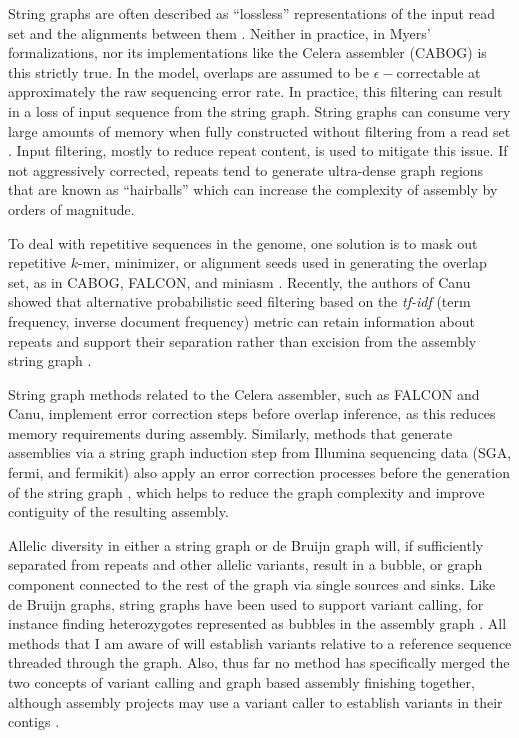 String graphs are often described as ``lossless'' representations of the input read set and the alignments between them \cite{li2012exploring}.
Neither in practice, in Myers' formalizations, nor its implementations like the Celera assembler (CABOG) \cite{miller2008aggressive} is this strictly true.
In the model, overlaps are assumed to be $\epsilon-$correctable at approximately the raw sequencing error rate.
In practice, this filtering can result in a loss of input sequence from the string graph.
String graphs can consume very large amounts of memory when fully constructed without filtering from a read set \cite{li2016minimap,koren2017canu}.
Input filtering, mostly to reduce repeat content, is used to mitigate this issue.
If not aggressively corrected, repeats tend to generate ultra-dense graph regions that are known as ``hairballs'' which can increase the complexity of assembly by orders of magnitude.

To deal with repetitive sequences in the genome, one solution is to mask out repetitive $k$-mer, minimizer, or alignment seeds used in generating the overlap set, as in CABOG, FALCON, and miniasm \cite{miller2008aggressive,chin2016phased,li2016minimap}.
Recently, the authors of Canu showed that alternative probabilistic seed filtering based on the \emph{tf-idf} (term frequency, inverse document frequency) metric can retain information about repeats and support their separation rather than excision from the assembly string graph \cite{koren2017canu}.

String graph methods related to the Celera assembler, such as FALCON and Canu, implement error correction steps before overlap inference, as this reduces memory requirements during assembly.
Similarly, methods that generate assemblies via a string graph induction step from Illumina sequencing data (SGA, fermi, and fermikit) also apply an error correction processes before the generation of the string graph \cite{simpson2012efficient,simpson2014exploring,li2015fermikit}, which helps to reduce the graph complexity and improve contiguity of the resulting assembly.

Allelic diversity in either a string graph or de Bruijn graph will, if sufficiently separated from repeats and other allelic variants, result in a bubble, or graph component connected to the rest of the graph via single sources and sinks.
Like de Bruijn graphs, string graphs have been used to support variant calling, for instance finding heterozygotes represented as bubbles in the assembly graph \cite{li2012exploring}.
All methods that I am aware of will establish variants relative to a reference sequence threaded through the graph.
Also, thus far no method has specifically merged the two concepts of variant calling and graph based assembly finishing together, although assembly projects may use a variant caller to establish variants in their contigs \cite{jain2018nanopore,schmid2018pushing}.

